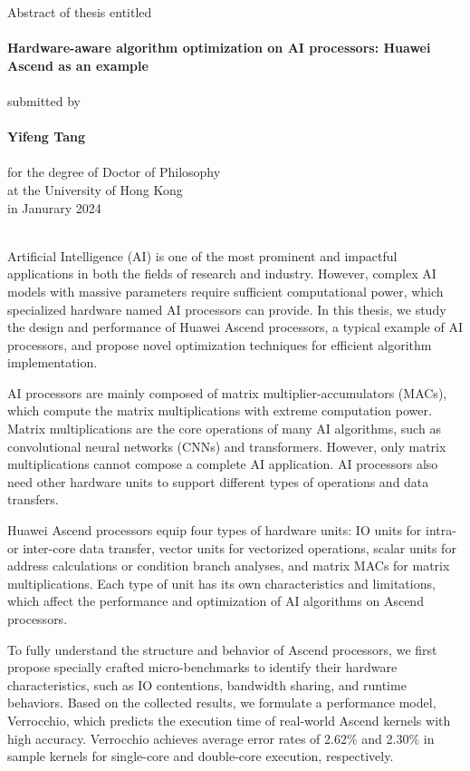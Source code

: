 \documentclass[12pt]{extbook}
\begin{document}
\centering
Abstract of thesis entitled\\
~\\
{\Large \bf 
    Hardware-aware algorithm optimization on AI processors: Huawei Ascend as an example
}\\
~\\
submitted by\\
~\\
{\Large \bf Yifeng Tang}\\
~\\
for the degree of Doctor of Philosophy\\
at the University of Hong Kong\\
in Janurary 2024\\
~\\
\justifying

Artificial Intelligence (AI) is one of the most prominent and impactful applications in both the fields of research and industry. However, complex AI models with massive parameters require sufficient computational power, which specialized hardware named AI processors can provide. In this thesis, we study the design and performance of Huawei Ascend processors, a typical example of AI processors, and propose novel optimization techniques for efficient algorithm implementation.

AI processors are mainly composed of matrix multiplier-accumulators (MACs), which compute the matrix multiplications with extreme computation power. Matrix multiplications are the core operations of many AI algorithms, such as convolutional neural networks (CNNs) and transformers. However, only matrix multiplications cannot compose a complete AI application. AI processors also need other hardware units to support different types of operations and data transfers.

Huawei Ascend processors equip four types of hardware units: IO units for intra- or inter-core data transfer, vector units for vectorized operations, scalar units for address calculations or condition branch analyses, and matrix MACs for matrix multiplications. Each type of unit has its own characteristics and limitations, which affect the performance and optimization of AI algorithms on Ascend processors.

To fully understand the structure and behavior of Ascend processors, we first propose specially crafted micro-benchmarks to identify their hardware characteristics, such as IO contentions, bandwidth sharing, and runtime behaviors. Based on the collected results, we formulate a performance model, Verrocchio, which predicts the execution time of real-world Ascend kernels with high accuracy. Verrocchio achieves average error rates of 2.62$\%$ and 2.30$\%$ in sample kernels for single-core and double-core execution, respectively.
\end{document}
